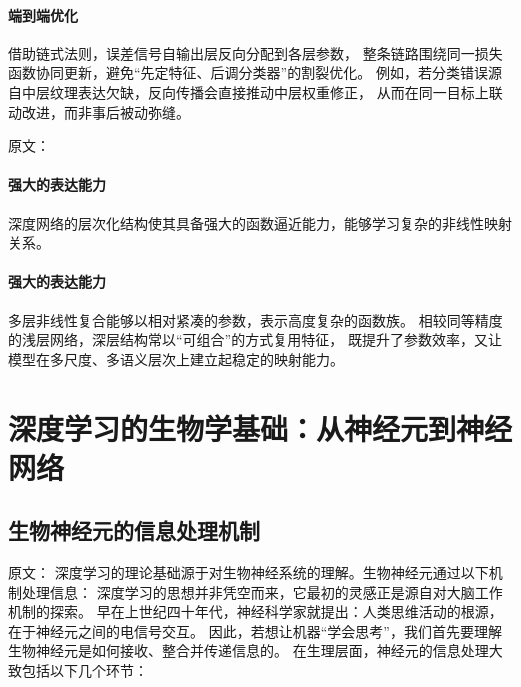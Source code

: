 \paragraph{端到端优化}
借助链式法则，误差信号自输出层反向分配到各层参数，  
整条链路围绕同一损失函数协同更新，避免“先定特征、后调分类器”的割裂优化。  
例如，若分类错误源自中层纹理表达欠缺，反向传播会直接推动中层权重修正，  
从而在同一目标上联动改进，而非事后被动弥缝。

原文：
\paragraph{强大的表达能力}
深度网络的层次化结构使其具备强大的函数逼近能力，能够学习复杂的非线性映射关系。
\paragraph{强大的表达能力}
多层非线性复合能够以相对紧凑的参数，表示高度复杂的函数族。  
相较同等精度的浅层网络，深层结构常以“可组合”的方式复用特征，  
既提升了参数效率，又让模型在多尺度、多语义层次上建立起稳定的映射能力。

\section{深度学习的生物学基础：从神经元到神经网络}

\subsection{生物神经元的信息处理机制}

原文：
深度学习的理论基础源于对生物神经系统的理解。生物神经元通过以下机制处理信息：
深度学习的思想并非凭空而来，它最初的灵感正是源自对大脑工作机制的探索。  
早在上世纪四十年代，神经科学家就提出：人类思维活动的根源，在于神经元之间的电信号交互。  
因此，若想让机器“学会思考”，我们首先要理解生物神经元是如何接收、整合并传递信息的。  
在生理层面，神经元的信息处理大致包括以下几个环节：

